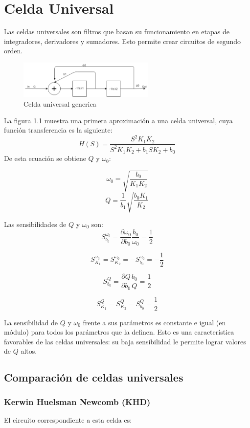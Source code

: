 \documentclass[../../tc_tp5_main.tex]{subfiles}
\begin{document}
\chapter{Celda Universal}

Las celdas universales son filtros que basan su funcionamiento en etapas de integradores, derivadores y sumadores. Esto permite crear circuitos de segundo orden.

\begin{figure}[H]	
	\centering
	\includegraphics[width=0.6\textwidth]{imagenes/uniGen.png}
	\caption{Celda universal generica}\label{fig:unigen}
\end{figure}

La figura \ref{fig:unigen} muestra una primera aproximación a una celda universal, cuya función transferencia es la siguiente:
$$ H(S)=\frac{S^2 K_1 K_2 }{S^2 K_1 K_2 + b_1 S K_2 + b_0 }$$
De esta ecuación se obtiene $Q$ y $\omega_0$:

$$\omega_0=\sqrt{\frac{b_0}{K_1 K_2}}$$
$$Q=\frac{1}{b_1}\sqrt{\frac{b_0 K_1}{K_2}}$$

Las sensibilidades de $Q$ y $\omega_0$ son:
$$ S^{\omega_0}_{b_0}=\frac{ \partial \omega_0}{\partial b_0} \frac{b_0}{\omega_0}= \frac {1}{2}$$

$$ S^{\omega_0}_{K_1}= S^{\omega_0}_{K_2}= - S^{\omega_0}_{b_0}= -\frac {1}{2}$$

$$ S^{Q}_{b_0}=\frac{ \partial Q}{\partial b_0} \frac{b_0}{Q}= \frac {1}{2}$$

$$ S^{Q}_{K_1}= S^{Q}_{K_2}= S^{Q}_{b_0}= \frac {1}{2}$$

La sensibilidad de $Q$ y $\omega_0$ frente a sus parámetros es constante e igual (en m\'odulo) para todos los par\'ametros que la definen. Esto es una característica favorables de las celdas universales: su baja sensibilidad le permite lograr valores de $Q$ altos.

\section{Comparación de celdas universales}

\subsection{Kerwin Huelsman Newcomb (KHD)}
El circuito correspondiente a esta celda es:
\end{document}
